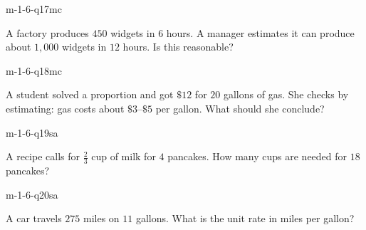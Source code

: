 \begin{practiceQuestion}{m-1-6-q17}{mc}
\begin{questionText}
A factory produces $450$ widgets in $6$ hours. A manager estimates it can produce about $1{,}000$ widgets in $12$ hours. Is this reasonable?
\end{questionText}
\end{practiceQuestion}

\begin{practiceQuestion}{m-1-6-q18}{mc}
\begin{questionText}
A student solved a proportion and got $\$12$ for $20$ gallons of gas. She checks by estimating: gas costs about $\$3$--$\$5$ per gallon. What should she conclude?
\end{questionText}
\end{practiceQuestion}


\begin{practiceQuestion}{m-1-6-q19}{sa}
\begin{questionText}
A recipe calls for $\frac{2}{3}$ cup of milk for $4$ pancakes. How many cups are needed for $18$ pancakes?
\end{questionText}
\end{practiceQuestion}

\begin{practiceQuestion}{m-1-6-q20}{sa}
\begin{questionText}
A car travels $275$ miles on $11$ gallons. What is the unit rate in miles per gallon?
\end{questionText}
\end{practiceQuestion}

